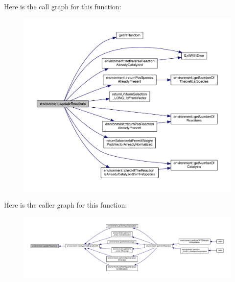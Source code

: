 Here is the call graph for this function\-:
\nopagebreak
\begin{figure}[H]
\begin{center}
\leavevmode
\includegraphics[width=350pt]{a00014_ace92235425bfbe692e3873ba5bb07639_cgraph}
\end{center}
\end{figure}




Here is the caller graph for this function\-:
\nopagebreak
\begin{figure}[H]
\begin{center}
\leavevmode
\includegraphics[width=350pt]{a00014_ace92235425bfbe692e3873ba5bb07639_icgraph}
\end{center}
\end{figure}


